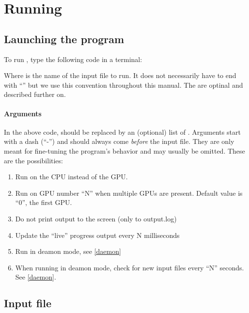\section{Running}

\subsection{Launching the program}

To run \prog, type the following code in a terminal:


Where \textit{} is the name of the input file to run. It does not necessarily have to end with ``'' but we use this convention throughout this manual. The \textit{} are optinal and described further on. 

\paragraph{Arguments} In the above code,  should be replaced by an (optional) list of . Arguments start with a dash (``-'') and should always come \emph{before} the input file. They are only meant for fine-tuning the program's behavior and may usually be omitted. These are the possibilities:

\begin{enumerate}
 \item [\idxcmd{-cpu}] Run on the CPU instead of the GPU.
 \item [\idxcmd{-gpu=N}] Run on GPU number ``N'' when multiple GPUs are present. Default value is ``0'', the first GPU.
 \item [\idxcmd{-silent}] Do not print output to the screen (only to output.log)
 \item [\idxcmd{-updatedisp=N}] Update the ``live'' progress output every N milliseconds
 \item [\idxcmd{-daemon}] Run in deamon mode, see \ref{daemon}
 \item [\idxcmd{-watch=N}] When running in deamon mode, check for new input files every ``N'' seconds. See \ref{daemon}.
\end{enumerate}


\subsection{Input file}

